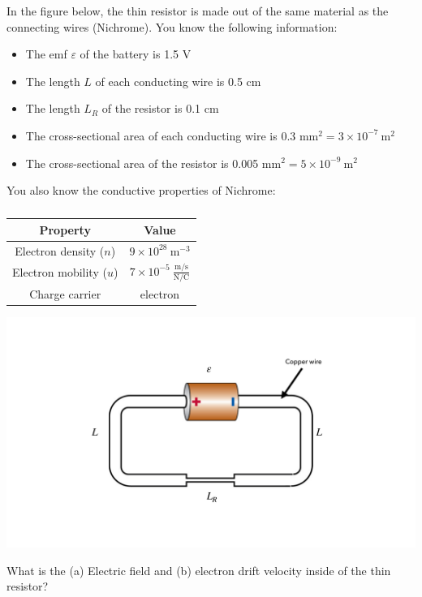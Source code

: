 \documentclass{article}
\begin{document}
In the figure below, the thin resistor is made out of the same material as the connecting wires (Nichrome). You know the following information:
\begin{itemize}
	\item The emf $\varepsilon$ of the battery is 1.5 V
	\item The length $L$ of each conducting wire is 0.5 cm
	\item The length $L_R$ of the resistor is 0.1 cm
	\item The cross-sectional area of each conducting wire is 0.3 mm$^2=3\times10^{-7}\ \mathrm{m}^2$
	\item The cross-sectional area of the resistor is 0.005 mm$^2=5\times10^{-9}\ \mathrm{m}^2$
\end{itemize}
You also know the conductive properties of Nichrome:
	\begin{table}[ht]
	\centering
	\begin{tabular}{|c|c|}
		\hline
		\textbf{Property} & \textbf{Value} \\
		\hline
		Electron density ($n$) & $9\times10^{28}\ \mathrm{m}^{-3}$\\
		\hline 
		Electron mobility ($u$) & $7\times10^{-5}\ \frac{\mathrm{m}/\mathrm{s}}{\mathrm{N}/\mathrm{C}}$\\
		\hline 
		Charge carrier & electron \\
		\hline
	\end{tabular}
	\caption{}
	\label{tab1}
\end{table}
\begin{center}
	\includegraphics[width=.5\textwidth]{thin_resistor_quiz}
\end{center}

What is the (a) Electric field and (b) electron drift velocity inside of the thin resistor?
\end{document}
